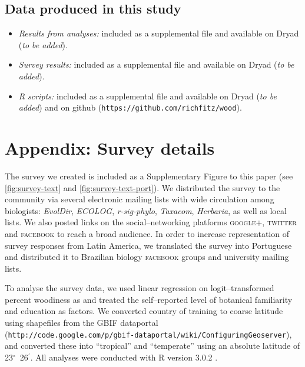 \documentclass[a4paper,12pt]{article}
\begin{document}
\subsection{Data produced in this study}
\begin{itemize}
\item \textit{Results from analyses:} included as a supplemental file
  and available on Dryad (\textit{to be added}).
\item \textit{Survey results:} included as a supplemental file and
  available on Dryad (\textit{to be added}).
\item \textit{R scripts:} included as a supplemental file and
  available on Dryad (\textit{to be added}) and on github
  (\texttt{https://github.com/richfitz/wood}).
\end{itemize}


\section{Appendix: Survey details}
%
The survey we created is included as a Supplementary Figure to
this paper (see \ref{fig:survey-text} and \ref{fig:survey-text-port}).
We distributed the survey to the 
community via several electronic
mailing lists with wide circulation among biologists: \emph{EvolDir},
\emph{ECOLOG}, \emph{\mbox{r-sig-phylo}}, \emph{Taxacom},
\emph{Herbaria}, as well as local lists. We also posted links on the
social--networking platforms \textsc{google+}, \textsc{twitter} and
\textsc{facebook} to reach a broad audience.
%
In order to increase representation of survey responses from Latin
America, we translated the survey into Portuguese and distributed it
to Brazilian biology \textsc{facebook} groups and university mailing
lists.

To analyse the survey data, we used linear regression on
logit--transformed percent woodiness as \citep[see][]{wartonarcsine}
and treated the self--reported level of botanical familiarity and
education as factors.  We converted country of training to coarse
latitude using shapefiles
from the GBIF dataportal\\
(\texttt{http://code.google.com/p/gbif-dataportal/wiki/ConfiguringGeoserver}),
and converted these into ``tropical'' and ``temperate'' using an
absolute latitude of 23$^\circ$~26$^\prime$.  All analyses were
conducted with R version 3.0.2 \citep{R}.
\end{document}
